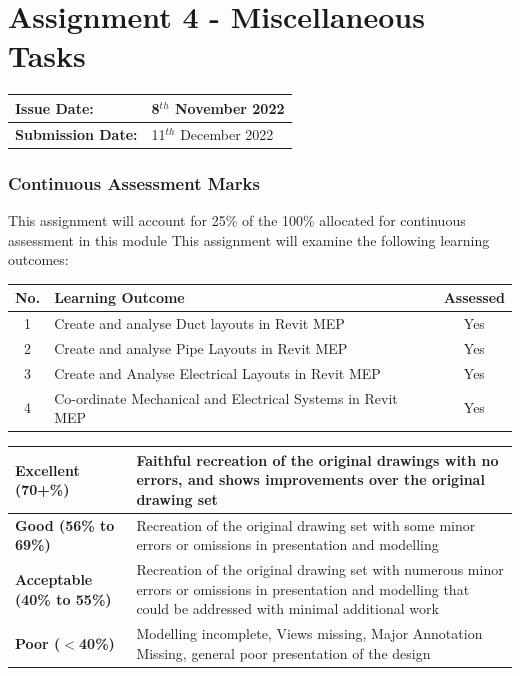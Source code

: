 
	
\part*{Assignment 4 - Miscellaneous Tasks}

\begin{tabularx}{\textwidth}{ |X|X| }
	\hline
	\textbf{Issue Date:} & 8$^{th}$ November 2022\\
	\hline 
	\textbf{Submission Date:}  & 11$^{th}$ December 2022\\
	\hline
\end{tabularx}

\section*{Continuous Assessment Marks}
This assignment will account for 25\% of the 100\% allocated for continuous assessment in this module
This assignment will examine the following learning outcomes:\\

\begin{tabularx}{\textwidth}{ |c|X|c| }
	\hline
	\textbf{No.} & \textbf{Learning Outcome} & \textbf{Assessed} \\
	\hline 
	1  & Create and analyse Duct layouts in Revit MEP & Yes \\
	2  & Create and analyse Pipe Layouts in Revit MEP & Yes \\
	3  & Create and Analyse Electrical Layouts in Revit MEP & Yes \\
	4  & Co-ordinate Mechanical and Electrical Systems in Revit MEP & Yes \\
	\hline
\end{tabularx}

\vspace{1cm}

\begin{tabularx}{\textwidth}{ |l|X| }
	\hline 
	\textbf{Excellent (70+\%)} & Faithful recreation of the original drawings with no errors, and shows improvements over the original drawing set\\ 
	\hline
	\textbf{Good (56\% to 69\%)} & Recreation of the original drawing set with some minor errors or omissions in presentation and modelling \\
	\hline
	\textbf{Acceptable (40\% to 55\%)} & Recreation of the original drawing set with numerous minor errors or omissions in presentation and modelling that could be addressed with minimal additional work \\ 
	\hline
	\textbf{Poor ($<$40\%)} & Modelling incomplete, Views missing, Major Annotation Missing, general poor presentation of the design  \\
	\hline
\end{tabularx}





